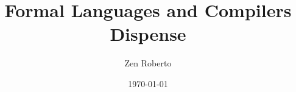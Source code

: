 \documentclass[a4paper]{book}
\begin{document}
\title{Formal Languages and Compilers\\Dispense}
\author{Zen Roberto}
\date{\today}
\maketitle



\tableofcontents




\end{document}
